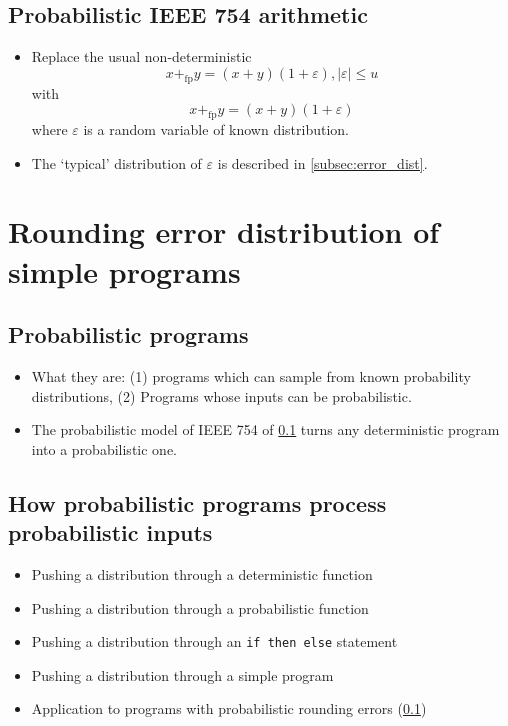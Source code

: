 \documentclass[10pt,conference]{IEEEtran}
\newcommand{\pfp}{+_{\mathrm{fp}}}
\newcommand{\absv}[1]{\vert #1\vert}
\begin{document}
\subsection{Probabilistic IEEE 754 arithmetic}\label{subsec:prob_ieee754}

\begin{itemize}
\item Replace the usual non-deterministic 
\[
x\pfp y=(x+y)(1+\varepsilon), \absv{\varepsilon}\leq u
\]
with
\[
x\pfp y=(x+y)(1+\varepsilon)
\]
where $\varepsilon$ is a random variable of known distribution.
\item The `typical' distribution of $\varepsilon$ is described in \cref{subsec:error_dist}.
\end{itemize}

\section{Rounding error distribution of simple programs}

\subsection{Probabilistic programs}
\begin{itemize}
\item What they are: (1) programs which can sample from known probability distributions, (2) Programs whose inputs can be probabilistic.
\item The probabilistic model of IEEE 754 of \cref{subsec:prob_ieee754} turns any deterministic program into a probabilistic one.
\end{itemize}

\subsection{How probabilistic programs process probabilistic inputs}
\begin{itemize}
\item Pushing a distribution through a deterministic function
\item Pushing a distribution through a probabilistic function
\item Pushing a distribution through an \texttt{if then else} statement
\item Pushing a distribution through a simple program
\item Application to programs with probabilistic rounding errors (\cref{subsec:prob_ieee754})
\end{itemize}
\end{document}
